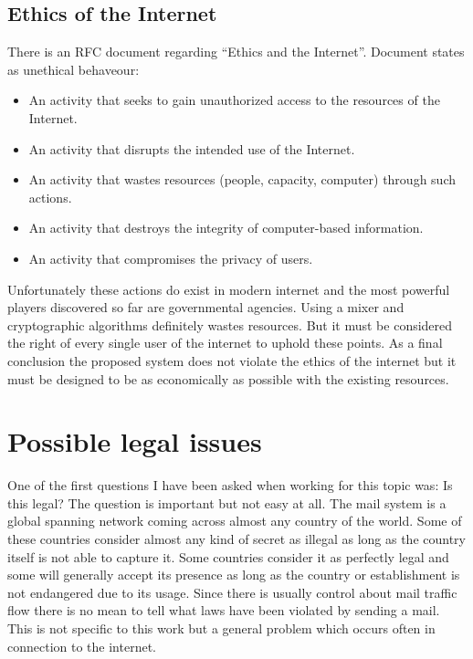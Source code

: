\subsection{Ethics of the Internet}
There is an RFC document regarding ``Ethics and the Internet''\cite[p.~1]{RFC1087}. Document states as unethical behaveour:
\begin{itemize}
\item An activity that seeks to gain unauthorized access to the resources of the Internet.
\item An activity that disrupts the intended use of the Internet.
\item An activity that wastes resources (people, capacity, computer) through such actions.
\item An activity that destroys the integrity of computer-based information.
\item An activity that compromises the privacy of users.
\end{itemize}
Unfortunately these actions do exist in modern internet and the most powerful players discovered so far are governmental agencies. Using a mixer and cryptographic algorithms definitely wastes resources. But it must be considered the right of every single user of the internet to uphold these points. As a final conclusion the proposed system does not violate the ethics of the internet but it must be designed to be as economically as possible with the existing resources.

\section{Possible legal issues}
One of the first questions I have been asked when working for this topic was: Is this legal? The question is important but not easy at all. The mail system is a global spanning network coming across almost any country of the world. Some of these countries consider almost any kind of secret as illegal as long as the country itself is not able to capture it. Some countries consider it as perfectly legal and some will generally accept its presence as long as the country or establishment is not endangered due to its usage. Since there is usually control about mail traffic flow there is no mean to tell what laws have been violated by sending a mail. This is not specific to this work but a general problem which occurs often in connection to the internet.\par

